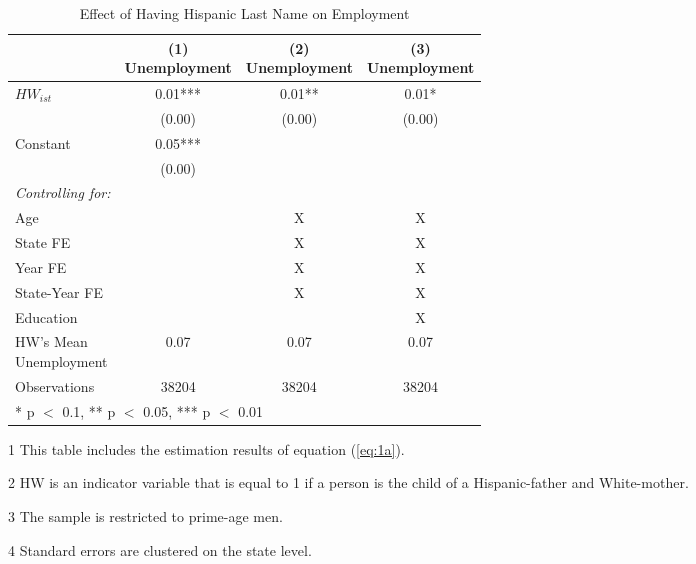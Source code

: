 \begin{table}[H]
\centering\centering
\caption{Effect of Having Hispanic Last Name on Employment \label{tab:lastnamereg-emp}}
\centering
\begin{threeparttable}
\begin{tabular}[t]{lccc}
\toprule
  & \specialcell{(1) \\ Unemployment} & \specialcell{(2) \\ Unemployment} & \specialcell{(3) \\  Unemployment}\\
\midrule
$HW_{ist}$ & \num{0.01}*** & \num{0.01}** & \num{0.01}*\\
 & (\num{0.00}) & (\num{0.00}) & (\num{0.00})\\
Constant & \num{0.05}*** &  & \\
 & (\num{0.00}) &  & \\
\midrule
\textit{Controlling for:} &  &  & \\
Age &  & X & X\\
State FE &  & X & X\\
Year FE &  & X & X\\
State-Year FE &  & X & X\\
Education &  &  & X\\
\specialcell{HW's Mean \\ Unemployment} & 0.07 & 0.07 & 0.07\\
Observations & \num{38204} & \num{38204} & \num{38204}\\
\bottomrule
\multicolumn{4}{l}{\rule{0pt}{1em}* p $<$ 0.1, ** p $<$ 0.05, *** p $<$ 0.01}\\
\end{tabular}
\begin{tablenotes}
\item[1] {\footnotesize{This table includes the estimation results of equation (\ref{eq:1a}).}}
\item[2] {\footnotesize{HW is an indicator variable that is equal to 1 if a person is the child of a Hispanic-father and White-mother.}}
\item[3] {\footnotesize{The sample is restricted to prime-age men.}}
\item[4] {\footnotesize{Standard errors are clustered on the state level.}}
\end{tablenotes}
\end{threeparttable}
\end{table}
